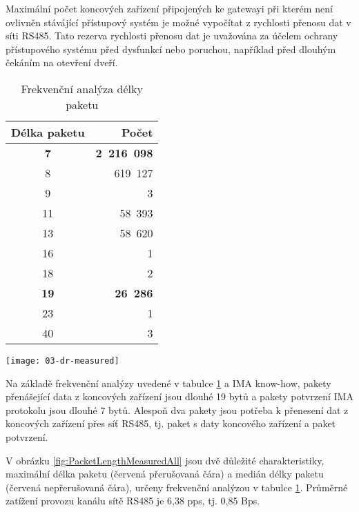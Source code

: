 Maximální počet koncových zařízení připojených ke gatewayi při kterém není ovlivněn stávájící přístupový systém je možné vypočítat z rychlosti přenosu dat v síti RS485. 
Tato rezerva rychlosti přenosu dat je uvažována za účelem ochrany přístupového systému před dysfunkcí nebo poruchou, například před dlouhým čekáním na otevření dveří.

\begin{longtable} {|c|r|}
\caption{Frekvenční analýza délky paketu} 
\label{tab:FreqAnalysis} \\
            \hline
    Délka paketu &  Počet \\ \hline
    \textbf{7}  &  \textbf{2~216~098}  \\
    8  &   619~127   \\
    9  &         3   \\
    11 &    58~393   \\
    13 &    58~620   \\
    16 &         1   \\
    18 &         2   \\
    \textbf{19} &    \textbf{26~286}   \\
    23 &         1   \\
    40 &         3   \\
    \hline
\end{longtable}

\newpage
\begin{figure*}[h]
    \centering
    \texttt{[image: 03-dr-measured]}
    \caption{Měřená rychlost přenosu dat [bps] v síti RS485 během doby testování}
    \label{fig:PacketLengthMeasuredAll}
\end{figure*}

Na základě frekvenční analýzy uvedené v tabulce \ref{tab:FreqAnalysis} a IMA know-how, pakety přenášející data z koncových zařízení jsou dlouhé 19 bytů a pakety potvrzení IMA protokolu jsou dlouhé 7 bytů. Alespoň dva pakety jsou potřeba k přenesení dat z koncových zařízení přes síť RS485, tj. paket s daty koncového zařízení a paket potvrzení.

V obrázku \ref{fig:PacketLengthMeasuredAll} jsou dvě důležité charakteristiky, maximální délka paketu 
(červená přerušovaná čára) a medián délky paketu (červená nepřerušovaná čára), určeny frekvenční analýzou v tabulce \ref{tab:FreqAnalysis}. 
Průměrné zatížení provozu kanálu sítě RS485 je 6,38 pps, tj. 0,85 Bps.


